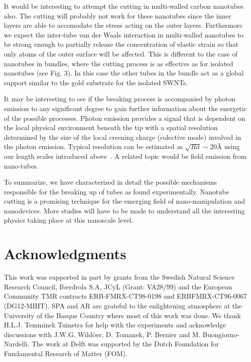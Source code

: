 \begin{multicols}{2}
It would be interesting to attempt the cutting in multi-walled
carbon nanotubes also. The cutting will probably not work for
these nanotubes since the inner layers are able to accomodate the
stress acting on the outer layers. Furthermore we expect the
inter-tube van der Waals interaction in multi-walled nanotubes to
be strong enough  to partially  release the concentration of
elastic strain so that only atoms of the outer surface will be
affected.  This is different to the case of nanotubes in bundles,
where the cutting process is as effective as for isolated
nanotubes (see Fig. 3). In this case the other tubes in the bundle
act as a global support similar to the gold substrate for the
isolated SWNTs.

It may be interesting to see if the breaking process is
accompanied by photon emission to any significant degree to gain
further information about the energetic of the possible processes.
Photon emission provides a signal that is dependent on the local
physical environment beneath the tip with a spatial resolution
determined by the size of the local creening charge (colective
mode) involved in the photon emission. Typical resolution can be
estimated as $\sqrt{Rd} \sim 20${\AA} using our length scales
introduced above~\cite {Johansson,comment_field}. A related topic
would be field emission from nano-tubes.

To summarize, we have characterized in detail the possible
mechanisms responsible for the breaking up of tubes as found
experimentally. Nanotube cutting is a promising technique for the
emerging field of nano-manipulation and nanodevices. More studies
will have to be made to understand all the interesting physics
taking place at this nanoscale level.

\section*{Acknowledgments}

\indent This work was supported in part by grants from the Swedish
Natural Science Research Council, Iberdrola S.A, JCyL (Grant:
VA28/99) and the European Community TMR contracts
ERB-FMRX-CT98-0198 and ERBFMRX-CT96-0067 (DG12-MIHT). SPA and AR
are grateful to the enlightening atmosphere at the University of
the Basque Country where most of this work was done. We thank
H.L.J. Temminck Tuinstra for help with the experiments and
acknowledge discussions with J.W.G. Wild\"oer, D. Tomanek, P.
Bernier and M. Buongiorno-Nardelli. The work at Delft was
supported by the Dutch Foundation for Fundamental Research of
Matter (FOM).
%
\begin{thebibliography}{99}


\end{thebibliography}
\end{multicols}
